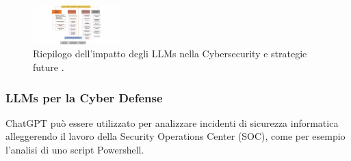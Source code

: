 \begin{figure}[ht]
	\centering
	\includegraphics[width=0.3\textwidth]{Immagini/Cybersceurity_impact.jpg}
	\caption{ Riepilogo dell'impatto degli LLMs nella Cybersecurity e strategie future \cite{10198233}.}
	\label{fig:cybersecurity-impact}
\end{figure}
\subsubsection{LLMs per la Cyber Defense}
ChatGPT può essere utilizzato per analizzare incidenti di sicurezza informatica alleggerendo il lavoro della Security Operations Center (SOC), come per esempio l'analisi di uno script Powershell.

